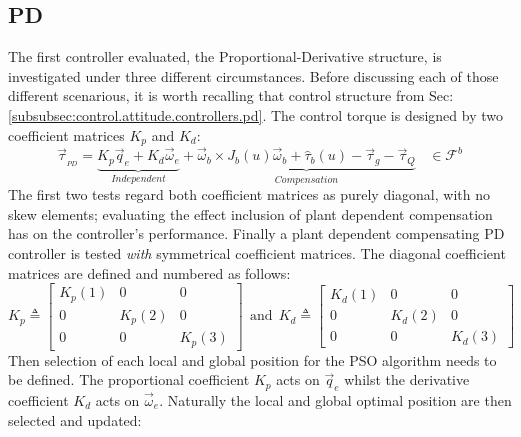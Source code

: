 \subsection{PD}
\label{subsec:simulation.attitude.pd}
The first controller evaluated, the Proportional-Derivative structure, is investigated under three different circumstances. Before discussing each of those different scenarious, it is worth recalling that control structure from Sec:\ref{subsubsec:control.attitude.controllers.pd}. The control torque is designed by two coefficient matrices $K_p$ and $K_d$:
\begin{equation}\label{eq:simulation-attitde-pd}
\vec{\tau}_{_{PD}}=\underbrace{K_p\vec{q}_e+K_d\vec{\omega}_e}_{Independent}+\underbrace{\vec{\omega}_b\times J_b(u)\vec{\omega}_b+\hat{\tau}_b(u)-\vec{\tau}_g-\vec{\tau}_Q}_{Compensation}~~~~\in\mathcal{F}^{b}
\end{equation}
The first two tests regard both coefficient matrices as purely diagonal, with no skew elements; evaluating the effect inclusion of plant dependent compensation has on the controller's performance. Finally a plant dependent compensating PD controller is tested \emph{with} symmetrical coefficient matrices. The diagonal coefficient matrices are defined and numbered as follows:
\begin{equation}\label{eq:simulation-attitde-pd-diagonal-coefficients}
K_p\triangleq \begin{bmatrix}
K_p(1) & 0 & 0\\
0 & K_p(2) & 0\\
0 & 0 & K_p(3)
\end{bmatrix}
~~\text{and}~~K_d\triangleq \begin{bmatrix}
K_d(1) & 0 & 0\\
0 & K_d(2) & 0\\
0 & 0 & K_d(3)
\end{bmatrix}
\end{equation}
Then selection of each local and global position for the PSO algorithm needs to be defined. The proportional coefficient $K_p$ acts on $\vec{q}_e$ whilst the derivative coefficient $K_d$ acts on $\vec{\omega}_e$. Naturally the local and global optimal position are then selected and updated:
